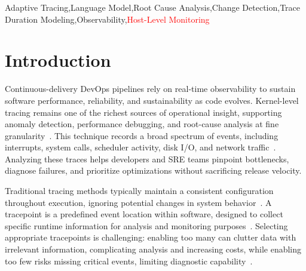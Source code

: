 \documentclass[preprint,12pt]{elsarticle}
\begin{document}
\begin{frontmatter}
\begin{keyword}
Adaptive Tracing\sep Language Model\sep Root Cause Analysis\sep Change Detection\sep Trace Duration Modeling\sep Observability\sep \textcolor{red}{Host-Level Monitoring}
\end{keyword}




\end{frontmatter}




\section{Introduction}
Continuous-delivery DevOps pipelines rely on real-time observability to sustain software performance, reliability, and sustainability as code evolves. Kernel-level tracing remains one of the richest sources of operational insight, supporting anomaly detection, performance debugging, and root-cause analysis at fine granularity~\cite{cantrill2004dynamic, parker2020distributed}. This technique records a broad spectrum of events, including interrupts, system calls, scheduler activity, disk I/O, and network traffic~\cite{chen2019scalable}. Analyzing these traces helps developers and SRE teams pinpoint bottlenecks, diagnose failures, and prioritize optimizations without sacrificing release velocity.

Traditional tracing methods typically maintain a consistent configuration throughout execution, ignoring potential changes in system behavior~\cite{parker-2020}. A tracepoint is a predefined event location within software, designed to collect specific runtime information for analysis and monitoring purposes~\cite{desnoyers2006low}. Selecting appropriate tracepoints is challenging: enabling too many can clutter data with irrelevant information, complicating analysis and increasing costs, while enabling too few risks missing critical events, limiting diagnostic capability~\cite{ates2019automated}.
\end{document}
